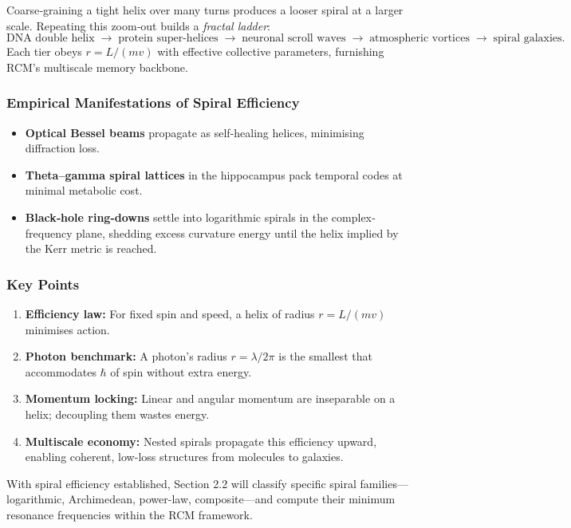 Coarse‐graining a tight helix over many turns produces a looser spiral at a larger scale.  Repeating this zoom‐out builds a \emph{fractal ladder}:
\[
  \text{DNA double helix}
  \;\to\;
  \text{protein super‐helices}
  \;\to\;
  \text{neuronal scroll waves}
  \;\to\;
  \text{atmospheric vortices}
  \;\to\;
  \text{spiral galaxies}.
\]
Each tier obeys \(r=L/(mv)\) with effective collective parameters, furnishing RCM’s multiscale memory backbone.

\subsubsection{Empirical Manifestations of Spiral Efficiency}

\begin{itemize}
  \item \textbf{Optical Bessel beams} propagate as self‐healing helices, minimising diffraction loss.
  \item \textbf{Theta–gamma spiral lattices} in the hippocampus pack temporal codes at minimal metabolic cost.
  \item \textbf{Black‐hole ring-downs} settle into logarithmic spirals in the complex‐frequency plane, shedding excess curvature energy until the helix implied by the Kerr metric is reached.
\end{itemize}

\subsubsection{Key Points}

\begin{enumerate}
  \item \textbf{Efficiency law:} For fixed spin and speed, a helix of radius \(r=L/(mv)\) minimises action.
  \item \textbf{Photon benchmark:} A photon’s radius \(r=\lambda/2\pi\) is the smallest that accommodates \(\hbar\) of spin without extra energy.
  \item \textbf{Momentum locking:} Linear and angular momentum are inseparable on a helix; decoupling them wastes energy.
  \item \textbf{Multiscale economy:} Nested spirals propagate this efficiency upward, enabling coherent, low-loss structures from molecules to galaxies.
\end{enumerate}

With spiral efficiency established, Section 2.2 will classify specific spiral families—logarithmic, Archimedean, power-law, composite—and compute their minimum resonance frequencies within the RCM framework.


